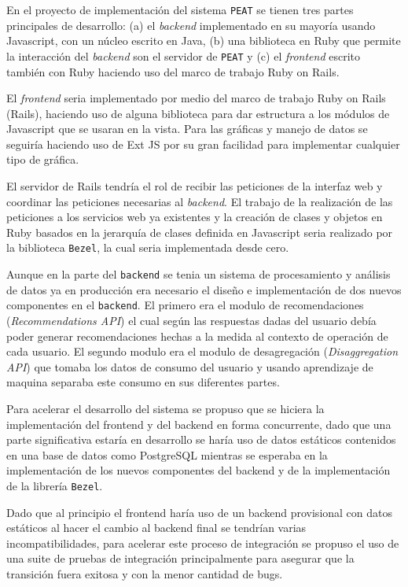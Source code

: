 En el proyecto de implementación del sistema \texttt{PEAT}
se tienen tres partes principales de desarrollo:
(a) el \textit{backend}  implementado en su mayoría usando
Javascript, con un núcleo escrito en Java, (b) una biblioteca en Ruby que permite
la interacción del \textit{backend} son el servidor de \texttt{PEAT} y
(c) el \textit{frontend} escrito también con Ruby haciendo uso del
marco de trabajo Ruby on Rails.

El \textit{frontend} seria implementado por medio del marco de trabajo
Ruby on Rails (Rails), haciendo uso de alguna biblioteca para dar estructura
a los módulos de Javascript que se usaran en la vista. Para las gráficas
y manejo de datos se seguiría haciendo uso de Ext JS por su gran facilidad
para implementar cualquier tipo de gráfica.

El servidor de Rails tendría el rol de recibir las peticiones de la
interfaz web y coordinar las peticiones necesarias al \textit{backend}. El trabajo
de la realización de las peticiones a los servicios web ya existentes
y la creación de clases y objetos en Ruby basados en la jerarquía de clases
definida en Javascript seria realizado por la biblioteca \texttt{Bezel},
la cual seria implementada desde cero.

Aunque en la parte del \texttt{backend} se tenia un sistema de procesamiento
y análisis de datos ya en producción era necesario el diseño e implementación
de dos nuevos componentes en el \texttt{backend}. El primero era el modulo de
recomendaciones (\textit{Recommendations API}) el cual según las respuestas
dadas del usuario debía poder generar recomendaciones hechas a la medida al
contexto de operación de cada usuario. El segundo modulo era el modulo de
desagregación (\textit{Disaggregation API}) que tomaba los datos de consumo
del usuario y usando aprendizaje de maquina separaba este consumo en sus
diferentes partes. %

Para acelerar el desarrollo del sistema se propuso que se hiciera la implementación
del frontend y del backend en forma concurrente, dado que una parte significativa
estaría en desarrollo se haría uso de datos estáticos contenidos en una base de
datos como PostgreSQL mientras se esperaba en la implementación de los nuevos
componentes del backend y de la implementación de la librería \texttt{Bezel}.

Dado que al principio el frontend haría uso de un backend provisional con datos
estáticos al hacer el cambio al backend final se tendrían varias incompatibilidades,
para acelerar este proceso de integración se propuso el uso de una suite de
pruebas de integración principalmente para asegurar que la transición fuera exitosa
y con la menor cantidad de bugs.

